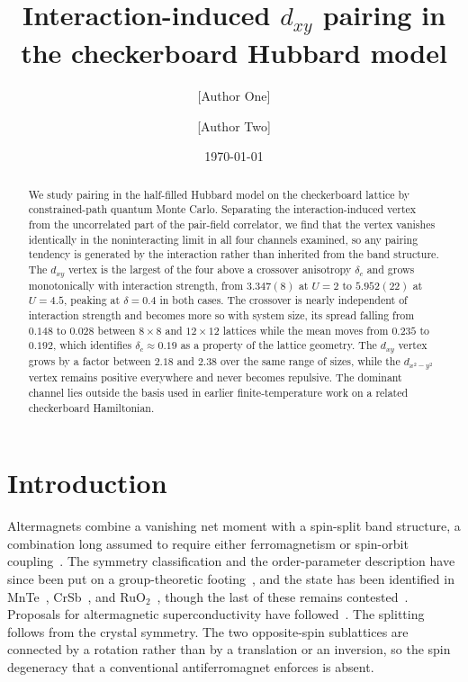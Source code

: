 \documentclass[aps,prb,reprint,superscriptaddress,amsmath,amssymb,floatfix]{revtex4-2}
\begin{document}
\title{Interaction-induced $d_{xy}$ pairing in the checkerboard Hubbard model}

\author{[Author One]}
\affiliation{[Affiliation]}
\author{[Author Two]}
\affiliation{[Affiliation]}

\date{\today}

\begin{abstract}
We study pairing in the half-filled Hubbard model on the checkerboard
lattice by constrained-path quantum Monte Carlo. Separating the
interaction-induced vertex from the uncorrelated part of the pair-field
correlator, we find that the vertex vanishes identically in the noninteracting
limit in all four channels examined, so any pairing tendency is generated by the
interaction rather than inherited from the band structure. The $d_{xy}$ vertex is
the largest of the four above a crossover anisotropy $\delta_c$ and grows
monotonically with interaction strength, from $3.347(8)$ at $U = 2$ to
$5.952(22)$ at $U = 4.5$, peaking at $\delta = 0.4$ in both cases. The crossover
is nearly independent of interaction strength and becomes more so with system
size, its spread falling from $0.148$ to $0.028$ between $8\times8$ and
$12\times12$ lattices while the mean moves from $0.235$ to $0.192$, which
identifies $\delta_c \approx 0.19$ as a property of the lattice geometry. The
$d_{xy}$ vertex grows by a factor between $2.18$ and $2.38$ over the same range
of sizes, while the $d_{x^2-y^2}$ vertex remains positive everywhere and never
becomes repulsive. The dominant channel lies outside the basis used in earlier
finite-temperature work on a related checkerboard Hamiltonian.
\end{abstract}

\maketitle

\section{Introduction}

Altermagnets combine a vanishing net moment with a spin-split band structure, a
combination long assumed to require either ferromagnetism or spin-orbit
coupling~\cite{Smejkal2022a,Smejkal2022b,SmejkalCrystal,Mazin2021}. The symmetry
classification and the order-parameter description have since been put on a
group-theoretic footing~\cite{McClarty2024,Bhowal2024,Roig2024}, and the state has
been identified in MnTe~\cite{Krempasky2024,Lee2024,Hariki2025},
CrSb~\cite{Reimers2024}, and RuO$_2$~\cite{Feng2022,Fedchenko2024}, though the last
of these remains contested~\cite{Bai2024}. Proposals for altermagnetic
superconductivity have followed~\cite{Brekke2023,Ouassou2023,Zhu2023,Chakraborty2024}.
The splitting follows from the crystal
symmetry. The two opposite-spin sublattices are connected by a rotation rather
than by a translation or an inversion, so the spin degeneracy that a conventional
antiferromagnet enforces is absent.
\end{document}
